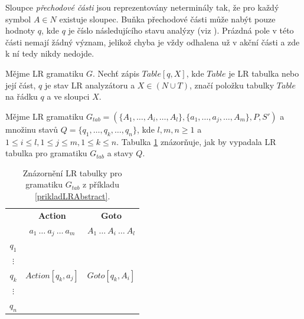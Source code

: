 Sloupce \emph{přechodové části} jsou reprezentovány neterminály tak, že pro každý symbol $A \in N$ existuje sloupec. Buňka přechodové části může nabýt pouze hodnoty $q$, kde $q$ je
číslo následujícího stavu analýzy (viz \cite{Alfred:2007:Compilers}). Prázdná pole v této části nemají žádný význam, jelikož chyba je vždy odhalena už v akční části a zde k ní tedy nikdy nedojde.

\begin{konvence}
  Mějme LR gramatiku $G$. Nechť zápis $Table[q, X]$, kde $Table$ je LR tabulka nebo její část, $q$ je stav LR analyzátoru a $X \in (N \cup T)$, značí položku tabulky $Table$ na řádku $q$ a ve
  sloupci $X$.
\end{konvence}

\begin{priklad} \label{prikladLRAbstract}
  Mějme LR gramatiku $G_{tab} = (\{A_1, \dots, A_i, \dots, A_l\}, \{a_1, \dots, a_j, \dots, A_m\}, P, S')$ a množinu stavů $Q = \{q_1, \dots, q_k, \dots, q_n\}$, kde
  $l, m, n \geq 1$ a $1 \leq i \leq l, 1 \leq j \leq m, 1 \leq k \leq n$. Tabulka \ref{tab:LRAbstract} znázorňuje, jak by vypadala LR tabulka pro gramatiku $G_{tab}$ a stavy $Q$.

  \begin{table}[ht]
    \centering
    \begin{tabular}{| c | c | c |} \hline
                            & \textbf{Action}                     & \textbf{Goto}                     \\ \cline{2-3}
                            & $a_1\ \dots\ a_j\ \dots\ a_m$       & $A_1\ \dots\ A_i\ \dots\ A_l$     \\ \hline
        $q_1$               & \multirow{6}{*}{$Action[q_k, a_j]$} & \multirow{6}{*}{$Goto[q_k, A_i]$} \\
        $\vdots$            & \multirow{6}{*}{}                   & \multirow{6}{*}{}                 \\
        $q_k$               & \multirow{6}{*}{}                   & \multirow{6}{*}{}                 \\
        $\vdots$            & \multirow{6}{*}{}                   & \multirow{6}{*}{}                 \\
        $q_n$               & \multirow{6}{*}{}                   & \multirow{6}{*}{}                 \\\hline
    \end{tabular}
    \caption{Znázornění LR tabulky pro gramatiku $G_{tab}$ z příkladu \ref{prikladLRAbstract}.}
    \label{tab:LRAbstract}
  \end{table}
\end{priklad}

